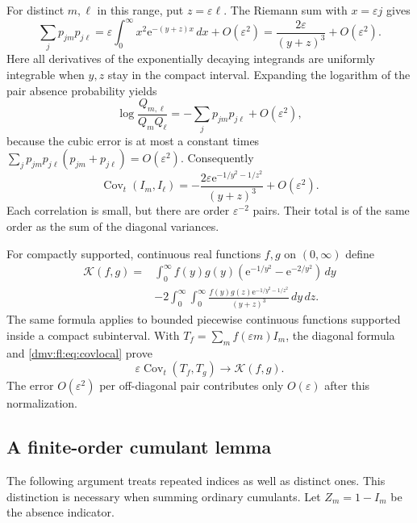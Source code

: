 \documentclass[11pt,letterpaper]{article}
\numberwithin{equation}{section}
\theoremstyle{definition}\newtheorem{definition}[theorem]{Definition}
\theoremstyle{remark}\newtheorem{remark}[theorem]{Remark}
\newcommand{\ee}{\mathrm e}
\newcommand{\eps}{\varepsilon}
\DeclareMathOperator{\Cov}{Cov}
\begin{document}
For distinct $m,\ell$ in this range, put $z=\eps\ell$. The Riemann sum
with $x=\eps j$ gives
\begin{equation}\label{dmv:fl:eq:pairintensity}
 \sum_jp_{jm}p_{j\ell}
 =\eps\int_0^\infty x^2\ee^{-(y+z)x}\,dx+O(\eps^2)
 =\frac{2\eps}{(y+z)^3}+O(\eps^2).
\end{equation}
Here all derivatives of the exponentially decaying integrands are
uniformly integrable when $y,z$ stay in the compact interval. Expanding
the logarithm of the pair absence probability yields
\[
 \log\frac{Q_{m,\ell}}{Q_mQ_\ell}
 =-\sum_jp_{jm}p_{j\ell}+O(\eps^2),
\]
because the cubic error is at most a constant times
$\sum_jp_{jm}p_{j\ell}(p_{jm}+p_{j\ell})=O(\eps^2)$. Consequently
\begin{equation}\label{dmv:fl:eq:covlocal}
 \Cov_t(I_m,I_\ell)
 =-\frac{2\eps\ee^{-1/y^2-1/z^2}}{(y+z)^3}+O(\eps^2).
\end{equation}
Each correlation is small, but there are order $\eps^{-2}$ pairs.
Their total is of the same order as the sum of the diagonal variances.

For compactly supported, continuous real functions $f,g$ on
$(0,\infty)$ define
\begin{align}\label{dmv:fl:eq:kernel}
 \mathcal K(f,g)={}&\int_0^\infty f(y)g(y)
       (\ee^{-1/y^2}-\ee^{-2/y^2})\,dy\\
 &-2\int_0^\infty\int_0^\infty
       \frac{f(y)g(z)\ee^{-1/y^2-1/z^2}}{(y+z)^3}\,dy\,dz.
 \nonumber
\end{align}
The same formula applies to bounded piecewise continuous functions
supported inside a compact subinterval. With
$T_f=\sum_m f(\eps m)I_m$, the diagonal formula and
\eqref{dmv:fl:eq:covlocal} prove
\begin{equation}\label{dmv:fl:eq:compactcov}
 \eps\Cov_t(T_f,T_g)\longrightarrow\mathcal K(f,g).
\end{equation}
The error $O(\eps^2)$ per off-diagonal pair contributes only $O(\eps)$
after this normalization.

\subsection{A finite-order cumulant lemma}
The following argument treats repeated indices as well as distinct
ones. This distinction is necessary when summing ordinary cumulants.
Let $Z_m=1-I_m$ be the absence indicator.
\end{document}
